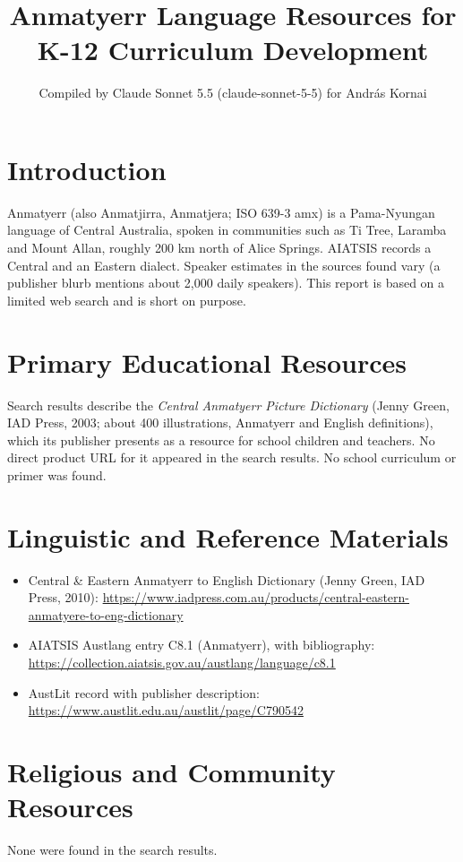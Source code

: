 \documentclass[12pt]{article}
\title{Anmatyerr Language Resources for K-12 Curriculum Development}
\author{Compiled by Claude Sonnet 5.5 (claude-sonnet-5-5) for Andr\'as Kornai}
\date{}
\begin{document}
\maketitle

\section{Introduction}
Anmatyerr (also Anmatjirra, Anmatjera; ISO 639-3 amx) is a Pama-Nyungan language of Central Australia, spoken in communities such as Ti Tree, Laramba and Mount Allan, roughly 200 km north of Alice Springs. AIATSIS records a Central and an Eastern dialect. Speaker estimates in the sources found vary (a publisher blurb mentions about 2,000 daily speakers). This report is based on a limited web search and is short on purpose.

\section{Primary Educational Resources}
Search results describe the \emph{Central Anmatyerr Picture Dictionary} (Jenny Green, IAD Press, 2003; about 400 illustrations, Anmatyerr and English definitions), which its publisher presents as a resource for school children and teachers. No direct product URL for it appeared in the search results. No school curriculum or primer was found.

\section{Linguistic and Reference Materials}
\begin{itemize}
\item Central \& Eastern Anmatyerr to English Dictionary (Jenny Green, IAD Press, 2010): \url{https://www.iadpress.com.au/products/central-eastern-anmatyere-to-eng-dictionary}
\item AIATSIS Austlang entry C8.1 (Anmatyerr), with bibliography: \url{https://collection.aiatsis.gov.au/austlang/language/c8.1}
\item AustLit record with publisher description: \url{https://www.austlit.edu.au/austlit/page/C790542}
\end{itemize}

\section{Religious and Community Resources}
None were found in the search results.
\end{document}

